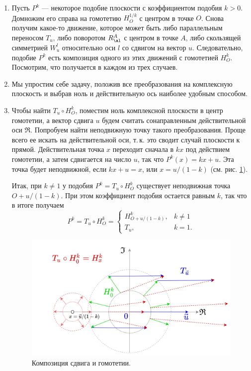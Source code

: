 \begin{enumerate}


\item Пусть $P^k$ --- некоторое подобие плоскости с коэффициентом подобия $k>0$. Домножим его справа на гомотетию $H_O^{1/k}$  с центром в точке $O$. Снова получим какое-то движение, которое может быть либо параллельным переносом $T_u$, либо поворотом $R_\al^A$ с центром в точке $A$, либо скользящей симметрией $W_u^l$ относительно оси $l$ со сдвигом на вектор $u$. Следовательно, подобие $P^k$ есть композиция одного из этих движений с гомотетией $H_O^k$. Посмотрим, что получается в каждом из трех случаев.
\item Мы упростим себе задачу, положив все преобразования на комплексную плоскость и выбрав ноль и действительную ось наиболее удобным способом.
\item Чтобы найти $T_u\circ H_O^k$, поместим ноль комплексной плоскости в центр гомотетии, а вектор сдвига $u$ будем считать сонаправленным действительной оси $\Re$. Попробуем найти неподвижную точку такого преобразования. Проще всего ее искать на действительной оси, т.\,к. это сводит случай плоскости к прямой. Действительная точка $x$ переходит сначала в $kx$ под действием гомотетии, а затем сдвигается на число $u$, так что $P^k(x)=kx+u$. Эта точка будет неподвижной, если $kx+u=x$, или $x=u/(1-k)$ (см. рис. \ref{TransHomot}).

Итак, при $k\ne 1$ у подобия $P^k=T_u\circ H_O^k$ существует неподвижная точка $O+u/(1-k)$. При этом коэффициент подобия остается равным $k$, так что в итоге получаем
$$
P^k=T_u\circ H_O^k = \begin{cases} H_{O+u/(1-k)}^k, & k\ne 1 \\ T_u, & k=1.\end{cases}
$$

\begin{figure}[hbt!]
\begin{center}
\includegraphics[scale=0.3]{TransHomot.png}
\end{center}\caption{Композиция сдвига и гомотетии.}\label{TransHomot}
\end{figure}



\end{enumerate}

